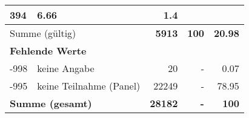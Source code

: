 \begin{longtable}{lXrrr}
       \num{394} &
       \num[round-mode=places,round-precision=2]{6.66} &
         \num[round-mode=places,round-precision=2]{1.4} \\
     \midrule
     \multicolumn{2}{l}{Summe (gültig)} &
       \textbf{\num{5913}} &
     \textbf{100} &
       \textbf{\num[round-mode=places,round-precision=2]{20.98}} \\
     \multicolumn{5}{l}{\textbf{Fehlende Werte}}\\
       -998 &
       keine Angabe &
         \num{20} &
        - &
         \num[round-mode=places,round-precision=2]{0.07} \\
       -995 &
       keine Teilnahme (Panel) &
         \num{22249} &
        - &
         \num[round-mode=places,round-precision=2]{78.95} \\
     \midrule
     \multicolumn{2}{l}{\textbf{Summe (gesamt)}} &
          \textbf{\num{28182}} &
        \textbf{-} &
        \textbf{100} \\
     \bottomrule
     \end{longtable}
     
